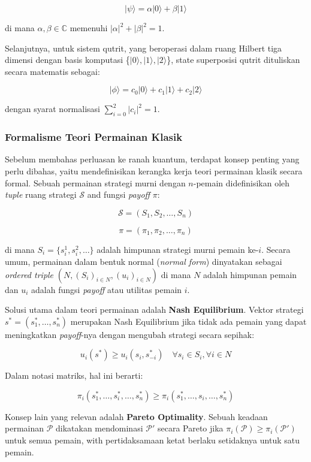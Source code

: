 \[ |\psi\rangle = \alpha|0\rangle + \beta|1\rangle \]

di mana $\alpha, \beta \in \mathbb{C}$ memenuhi $|\alpha|^2 + |\beta|^2 = 1$.

Selanjutnya, untuk sistem qutrit, yang beroperasi dalam ruang Hilbert tiga dimensi dengan basis komputasi \{$|0\rangle, |1\rangle, |2\rangle$\}, state superposisi qutrit dituliskan secara matematis sebagai:

\[ |\phi\rangle = c_0|0\rangle + c_1|1\rangle + c_2|2\rangle \]

dengan syarat normalisasi $\sum_{i=0}^2 |c_i|^2 = 1$.

\subsubsection{Formalisme Teori Permainan Klasik}

Sebelum membahas perluasan ke ranah kuantum, terdapat konsep penting yang perlu dibahas, yaitu mendefinisikan kerangka kerja teori permainan klasik secara formal. Sebuah permainan strategi murni dengan $n$-pemain didefinisikan oleh \textit{tuple} ruang strategi $\mathcal{S}$ and fungsi \textit{payoff} $\pi$:

\[ \mathcal{S} = (S_1, S_2, \dots, S_n) \]

\[ \pi = (\pi_1, \pi_2, \dots, \pi_n) \]

di mana $S_i = \{s_i^1, s_i^2, \dots \}$ adalah himpunan strategi murni pemain ke-$i$. Secara umum, permainan dalam bentuk normal (\textit{normal form}) dinyatakan sebagai \textit{ordered triple} $(N, (S_i)_{i \in N}, (u_i)_{i \in N})$ di mana $N$ adalah himpunan pemain dan $u_i$ adalah fungsi \textit{payoff} atau utilitas pemain $i$.

Solusi utama dalam teori permainan adalah \textbf{Nash Equilibrium}. Vektor strategi $s^* = (s_1^*, \dots, s_n^*)$ merupakan Nash Equilibrium jika tidak ada pemain yang dapat meningkatkan \textit{payoff}-nya dengan mengubah strategi secara sepihak:

\[ u_i(s^*) \geq u_i(s_i, s^*_{-i}) \quad \forall s_i \in S_i, \forall i \in N \]

Dalam notasi matriks, hal ini berarti:

\[ \pi_i(s_1^*, \dots, s_i^*, \dots, s_n^*) \geq \pi_i(s_1^*, \dots, s_i, \dots, s_n^*) \]

Konsep lain yang relevan adalah \textbf{Pareto Optimality}. Sebuah keadaan permainan $\mathcal{P}$ dikatakan mendominasi $\mathcal{P}'$ secara Pareto jika $\pi_i(\mathcal{P}) \geq \pi_i(\mathcal{P}')$ untuk semua pemain, with pertidaksamaan ketat berlaku setidaknya untuk satu pemain.

